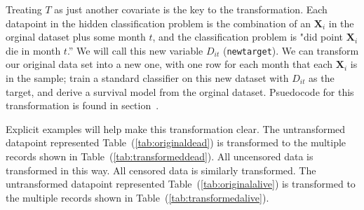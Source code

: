 \documentclass[10pt,letterpaper]{article}
\newcommand{\codewhite}[1]{\colorbox{white}{\texttt{#1}}}
\begin{document}







Treating $T$ as just another covariate is the key to the transformation. Each datapoint in the hidden classification problem is the combination of an $\mathbf{X}_{i}$ in the orginal dataset plus some month $t$, and the classification problem is "did point $\mathbf{X}_{i}$ die in month $t$.'' We will call this new variable $D_{it}$ (\codewhite{newtarget}).
We can transform our original data set into a new one, with one row for each month that each $\mathbf{X}_{i}$ is in the sample; train a standard classifier on this new dataset with $D_{it}$ as the target, and derive a survival model from the orginal dataset.
Psuedocode for this transformation is found in section~.

Explicit examples will help make this transformation clear.
The untransformed datapoint represented Table~(\ref{tab:originaldead}) is transformed to the multiple records shown in Table~(\ref{tab:transformeddead}). All uncensored data is transformed in this way. All censored data is similarly transformed. 
The untransformed datapoint represented Table~(\ref{tab:originalalive}) is transformed to the multiple records shown in Table~(\ref{tab:transformedalive}).
\end{document}
